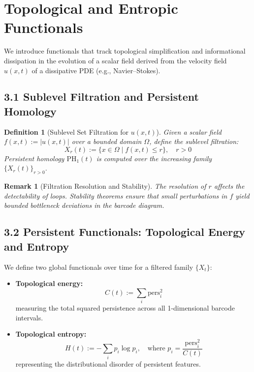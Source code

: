 \documentclass[11pt]{article}
\newtheorem{definition}[theorem]{Definition}
\newtheorem{remark}[theorem]{Remark}
\begin{document}

\section{Topological and Entropic Functionals}

We introduce functionals that track topological simplification and informational dissipation in the evolution of a scalar field derived from the velocity field $u(x,t)$ of a dissipative PDE (e.g., Navier--Stokes).

\subsection{3.1 Sublevel Filtration and Persistent Homology}

\begin{definition}[Sublevel Set Filtration for $u(x,t)$]
Given a scalar field $f(x,t) := |u(x,t)|$ over a bounded domain $\Omega$, define the sublevel filtration:
\[
X_r(t) := \{ x \in \Omega \mid f(x,t) \leq r \}, \quad r > 0
\]
Persistent homology $\mathrm{PH}_1(t)$ is computed over the increasing family $\{ X_r(t) \}_{r > 0}$.
\end{definition}

\begin{remark}[Filtration Resolution and Stability]
The resolution of $r$ affects the detectability of loops. Stability theorems ensure that small perturbations in $f$ yield bounded bottleneck deviations in the barcode diagram.
\end{remark}

\subsection{3.2 Persistent Functionals: Topological Energy and Entropy}

We define two global functionals over time for a filtered family $\{X_t\}$:
\begin{itemize}
  \item \textbf{Topological energy:} 
  \[
  C(t) := \sum_i \mathrm{pers}_i^2
  \]
  measuring the total squared persistence across all 1-dimensional barcode intervals.
  
  \item \textbf{Topological entropy:}
  \[
  H(t) := -\sum_i p_i \log p_i, \quad \text{where } p_i = \frac{\mathrm{pers}_i^2}{C(t)}
  \]
  representing the distributional disorder of persistent features.
\end{itemize}
\end{document}
